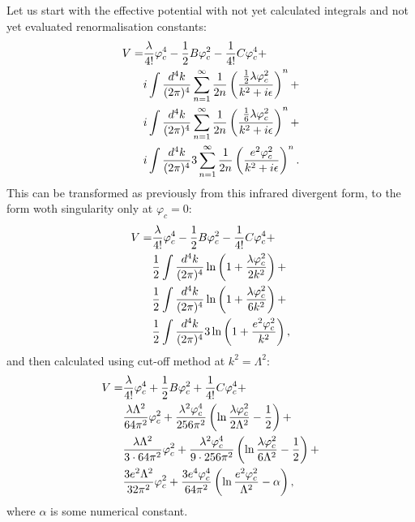 Let us start with the effective potential with not yet calculated integrals and not yet evaluated 
renormalisation constants:
\begin{align}
V = &\frac{\lambda}{4!}\varphi_c^4-\frac{1}{2}B\varphi_c^2-\frac{1}{4!}C\varphi_c^4 + \notag \\
&i\int\frac{d^4k}{(2\pi)^4}\sum\limits_{n=1}^\infty\frac{1}{2n}
\left(\frac{\frac{1}{2}\lambda\varphi_c^2}{k^2+i\epsilon}\right)^n + \notag \\
&i\int\frac{d^4k}{(2\pi)^4}\sum\limits_{n=1}^\infty\frac{1}{2n}
\left(\frac{\frac{1}{6}\lambda\varphi_c^2}{k^2+i\epsilon}\right)^n + \notag \\
&i\int\frac{d^4k}{(2\pi)^4}3\sum\limits_{n=1}^\infty\frac{1}{2n}
\left(\frac{e^2\varphi_c^2}{k^2+i\epsilon}\right)^n.
\end{align}
This can be transformed as previously from this infrared divergent form, to the form woth 
singularity only at $\varphi_c=0$:
\begin{align}
V=&\frac{\lambda}{4!}\varphi_c^4-\frac{1}{2}B\varphi_c^2-\frac{1}{4!}C\varphi_c^4 + \notag \\
&\frac{1}{2}\int\frac{d^4k}{(2\pi)^4}\ln\left(1+\frac{\lambda\varphi_c^2}{2k^2}\right) + \notag \\
&\frac{1}{2}\int\frac{d^4k}{(2\pi)^4}\ln\left(1+\frac{\lambda\varphi_c^2}{6k^2}\right) + \notag \\
&\frac{1}{2}\int\frac{d^4k}{(2\pi)^4}3\ln\left(1+\frac{e^2\varphi_c^2}{k^2}\right),
\end{align}
and then calculated using cut-off method at $k^2=\Lambda^2$:
\begin{align}
V=&\frac{\lambda}{4!}\varphi_c^4+\frac{1}{2}B\varphi_c^2+\frac{1}{4!}C\varphi_c^4+ \notag \\
&\frac{\lambda\Lambda^2}{64\pi^2}\varphi_c^2+\frac{\lambda^2\varphi_c^4}{256\pi^2}
\left(\ln\frac{\lambda\varphi_c^2}{2\Lambda^2}-\frac{1}{2}\right) + \notag \\
&\frac{\lambda\Lambda^2}{3\cdot 64\pi^2}\varphi_c^2+\frac{\lambda^2\varphi_c^4}{9\cdot 256\pi^2}
\left(\ln\frac{\lambda\varphi_c^2}{6\Lambda^2}-\frac{1}{2}\right) + \notag \\
&\frac{3e^2\Lambda^2}{32\pi^2}\varphi_c^2+\frac{3e^4\varphi_c^4}{64\pi^2}
\left(\ln\frac{e^2\varphi_c^2}{\Lambda^2}-\alpha\right),
\end{align}
where $\alpha$ is some numerical constant.

